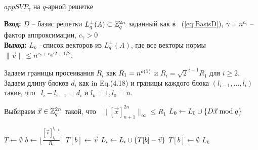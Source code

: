 \documentclass[a4paper,11pt]{article}
\begin{document}
\begin{algorithm}[t]
	\caption{$appSVP_{\gamma}$ на $q$-арной решетке}
	\textbf{Вход:} $D$ -- базис решетки $L^{\perp}_q (A) \subset {{\mathbb Z}}_q^{2n}$ заданный как в ~(\ref{eq:BasisD}), $\gamma = n^{c_{\gamma}}$ -- фактор аппроксимации, $c_{\gamma}>0$ \\
	\textbf{Выход:} $L_k$ --список векторов из $L^{\perp}_q (A)$, где все векторы нормы $\| \vec{v} \| \leq n^{c_{\gamma}+c_q/2+1/2}$;
	
	\begin{algorithmic}[1]
		
		\State Задаем границы просеивания $R_i$ как $R_1 = n^{o(1)}$ и $R_i = \sqrt{2}^{i-1} R_1$ для $i \geq 2$.
		\State Задаем длину блоков $d_i$ как in Eq.(4.18) и границы каждого блока $(l_{i-1}, \ldots, l_i)$ такие, что \ $l_{i}-{l_{i-1}} = d_i$ и $l_k = 1, l_0 = n$.
		
		\Repeat {}
		\State Выбираем $\vec{x} \in {{\mathbb Z}}_q^{2n}$ такой, что \ $\| [\vec{x}]_{n+1}^{2n} \|_{\infty} \leq R_1$
		\State $L_0 \gets L_0 \mathbin{\cup} \{D\vec{x} \bmod q\} $
		
		\State $T \gets \emptyset$ 
				\State $b \gets \Big\lfloor \frac{[\vec{v}]_{l_i}^{l_{i-1}}}{R_i} \Big\rceil$ 
					\State $T[b] \gets \vec{v}$
				\Else
					\State $L_{i} \gets L_{i} \mathbin{\cup} \{T[b] - \vec{v} \}$
					\State $T[b] \gets \emptyset$
				\EndIf
			\EndFor
		\EndFor
		\State \Return $L_k$
	\end{algorithmic}
	
	\vspace{10pt}
	
\end{algorithm}
\end{document}
